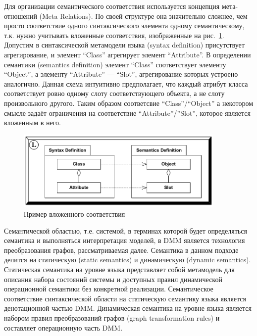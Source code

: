 \documentclass[a5paper]{article}
\begin{document}
Для организации семантического соответствия используется концепция мета-отношений (Meta Relations). По своей структуре она значительно сложнее, чем просто соответствие одного синтаксического элемента одному семантическому, т.к. нужно учитывать вложенные соответствия, изображенные на рис.~\ref{fig4}. Допустим в синтаксической метамодели языка (syntax definition) присутствует агрегирование, и элемент “Class” агрегирует элемент “Attribute”. В определении семантики (semantics definition) элемент “Class” соответствует элементу “Object”, а элементу “Attribute” — “Slot”, агрегирование которых устроено аналогично. Данная схема интуитивно предполагает, что каждый атрибут класса соответствует ровно одному слоту соответствующего объекта, а не слоту произвольного другого. Таким образом соответсвие ``Class''/``Object'' а некотором смысле задаёт ограничения на соответствие “Attribute”/”Slot”, которое является вложенным в него.

\begin{figure} [ht]
  \begin{center}
    \includegraphics[width=0.9\textwidth]{dmm-metarelations.png}
    \caption{Пример вложенного соответствия}
    \label{fig4}
  \end{center}
\end{figure}

Семантической областью, т.е. системой, в терминах которой будет определяться семантика и выполняться интерпретация моделей, в DMM является технология преобразования графов, рассматриваемая далее. Семантика в данном подходе делится на статическую (static semantics) и динамическую (dynamic semantics). Статическая семантика на уровне языка представляет собой метамодель для описания набора состояний системы и доступных правил динамической операционной семантики без конкретной реализации. Семантическое соответствие синтаксической области на статическую семантику языка является денотационной частью DMM. Динамическая семантика на уровне языка является набором правил преобразований графов (graph transformation rules) и составляет операционную часть DMM.
\end{document}
